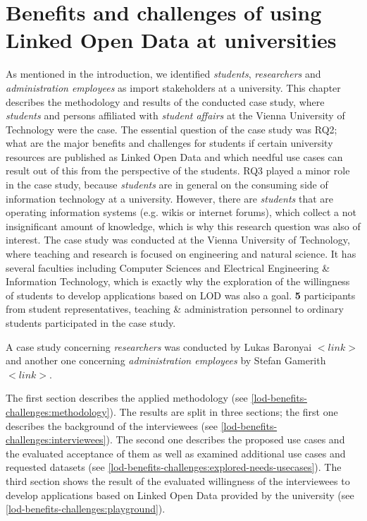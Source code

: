 \documentclass{article}
\begin{document}
\section{Benefits and challenges of using Linked Open Data at universities}
\label{lod-benefits-challenges}
As mentioned in the introduction, we identified \textit{students}, \textit{researchers} and \textit{administration employees} as import stakeholders at a university. This chapter describes the methodology and results of the conducted case study, where \textit{students} and persons affiliated with \textit{student affairs} at the Vienna University of Technology were the case. The essential question of the case study was RQ2; what are the major benefits and challenges for students if certain university resources are published as Linked Open Data and which needful use cases can result out of this from the perspective of the students. RQ3 played a minor role in the case study, because \textit{students} are in general on the consuming side of information technology at a university. However, there are \textit{students} that are operating information systems (e.g. wikis or internet forums), which collect a not insignificant amount of knowledge, which is why this research question was also of interest. The case study was conducted at the Vienna University of Technology, where teaching and research is focused on engineering and natural science.  It has several faculties including Computer Sciences and Electrical Engineering \& Information Technology, which is exactly why the exploration of the willingness of students to develop applications based on LOD was also a goal. \textbf{5} participants from student representatives, teaching \& administration personnel to ordinary students participated in the case study.

A case study concerning \textit{researchers} was conducted by Lukas Baronyai $<link>$ and another one concerning \textit{administration employees} by Stefan Gamerith $<link>$. 

The first section describes the applied methodology (see \ref{lod-benefits-challenges:methodology}). The results are split in three sections; the first one describes the background of the interviewees (see \ref{lod-benefits-challenges:interviewees}). The second one describes the proposed use cases and the evaluated acceptance of them as well as examined additional use cases and requested datasets (see \ref{lod-benefits-challenges:explored-needs-usecases}). The third section shows the result of the evaluated willingness of the interviewees to develop applications based on Linked Open Data provided by the university (see \ref{lod-benefits-challenges:playground}).
\end{document}
